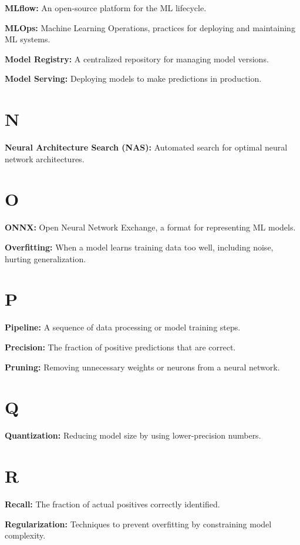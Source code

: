 \textbf{MLflow:} An open-source platform for the ML lifecycle.

\textbf{MLOps:} Machine Learning Operations, practices for deploying and maintaining ML systems.

\textbf{Model Registry:} A centralized repository for managing model versions.

\textbf{Model Serving:} Deploying models to make predictions in production.

\section*{N}

\textbf{Neural Architecture Search (NAS):} Automated search for optimal neural network architectures.

\section*{O}

\textbf{ONNX:} Open Neural Network Exchange, a format for representing ML models.

\textbf{Overfitting:} When a model learns training data too well, including noise, hurting generalization.

\section*{P}

\textbf{Pipeline:} A sequence of data processing or model training steps.

\textbf{Precision:} The fraction of positive predictions that are correct.

\textbf{Pruning:} Removing unnecessary weights or neurons from a neural network.

\section*{Q}

\textbf{Quantization:} Reducing model size by using lower-precision numbers.

\section*{R}

\textbf{Recall:} The fraction of actual positives correctly identified.

\textbf{Regularization:} Techniques to prevent overfitting by constraining model complexity.

